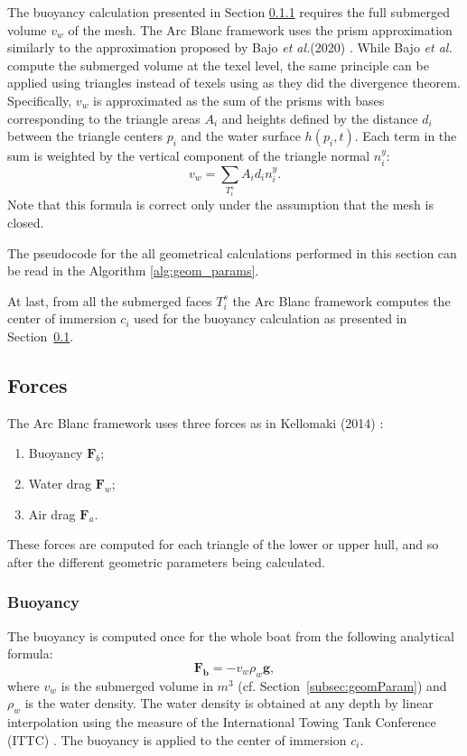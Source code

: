 \documentclass[11pt]{article}
\def\Framework{The Arc Blanc framework\xspace}
\def\framework{the Arc Blanc framework\xspace}
\def\etal{\emph{et al.}\xspace}
\begin{document}
The buoyancy calculation presented in Section \ref{subsubsec:buoyancy} requires the full submerged volume $v_w$ of the mesh.
\Framework uses the prism approximation similarly to the approximation proposed by Bajo \etal (2020) \cite{bajoRealisticBuoyancyModel2020}.
While Bajo \etal compute the submerged volume at the texel level, the same principle can be applied using triangles instead of texels using as they did the divergence theorem.
Specifically, $v_w$ is approximated as the sum of the prisms with bases corresponding to the triangle areas $A_i$ and heights defined by the distance $d_i$ between the triangle centers $p_i$ and the water surface $h(p_i,t)$.
Each term in the sum is weighted by the vertical component of the triangle normal $n_i^y$:
\begin{equation}
	v_w = \sum_{T_i^s} A_i d_i n_i^y.
\end{equation}
Note that this formula is correct only under the assumption that the mesh is closed.

The pseudocode for the all geometrical calculations performed in this section can be read in the Algorithm \ref{alg:geom_params}.





At last, from all the submerged faces $T_i^s$ \framework computes the center of immersion $c_i$ used for the buoyancy calculation as presented in Section~\ref{subsec:forces}.

\subsection{Forces}
\label{subsec:forces}
\Framework uses three forces as in Kellomaki (2014) \cite{kellomakiRigidBodyInteraction2014}:
\begin{enumerate}
	\item Buoyancy $\mathbf{F}_b$;
	\item Water drag $\mathbf{F}_w$;
	\item Air drag $\mathbf{F}_a$.
\end{enumerate}
These forces are computed for each triangle of the lower or upper hull, and so after the different geometric parameters being calculated.

\subsubsection{Buoyancy}
\label{subsubsec:buoyancy}
The buoyancy is computed once for the whole boat from the following analytical formula:
\begin{equation}
	\mathbf{F_b} = - v_w \rho_w \mathbf g,
\end{equation}
where $v_w$ is the submerged volume in $m^3$ (cf. Section~\ref{subsec:geomParam}) and $\rho_w$ is the water density.
The water density is obtained at any depth by linear interpolation using the measure of the International Towing Tank Conference (ITTC) \cite{ittcFreshWaterSeawater2011}.
The buoyancy is applied to the center of immersion $c_i$.
\end{document}

